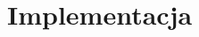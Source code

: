 \documentclass[../main.tex]{subfiles}
\begin{document}
\section{Implementacja}
        
    
    \newpage
    
    \newpage
          
\end{document}
